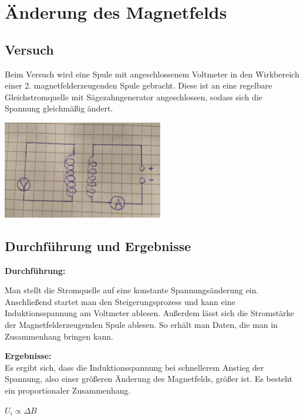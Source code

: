 \documentclass{article}
\begin{document}

\section*{Änderung des Magnetfelds}

\subsection*{Versuch}

\begin{multicols}{2}
    Beim Versuch wird eine Spule mit angeschlossenem Voltmeter in den Wirkbereich
    einer 2. magnetfelderzeugenden Spule gebracht. Diese ist an eine regelbare
    Gleichstromquelle mit Sägezahngenerator angeschlossen, sodass sich die
    Spannung gleichmäßig ändert.

    \columnbreak
    \begin{center}
        \includegraphics[width=7cm]{./images/induktion_versuch_spulen_haendisch.jpg}
    \end{center}

\end{multicols}

\subsection*{Durchführung und Ergebnisse}

\begin{multicols}{2}

    \textbf{Durchführung:}

    Man stellt die Stromquelle auf eine konstante Spannungsänderung ein.
    Anschließend startet man den Steigerungsprozess und kann eine Induktionsspannung
    am Voltmeter ablesen. Außerdem lässt sich die Stromstärke der Magnetfelderzeugenden
    Spule ablesen. So erhält man Daten, die man in Zusammenhang bringen kann.
    \columnbreak

    \textbf{Ergebnisse:} \\
    Es ergibt sich, dass die Induktionsspannung bei schnellerem Anstieg der Spannung,
    also einer größeren Änderung des Magnetfelds, größer ist.
    Es besteht ein proportionaler Zusammenhang.
    \newline

    \Large
    \hspace{1cm}$U_{i} \propto \Delta B$

\end{multicols}
\end{document}

